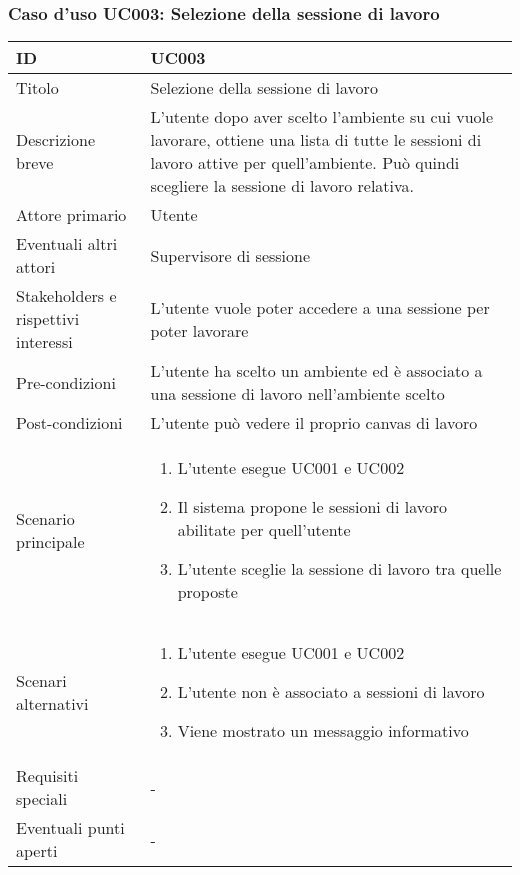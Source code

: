 \documentclass[../../main.tex]{subfiles}
\begin{document}
\subsubsection{Caso d’uso UC003: Selezione della sessione di lavoro }
\begin{tabularx}{150mm}{|l|X|}
    \hline
    ID                                  & \textbf{UC003}\\
    \hline
    Titolo                              & Selezione della sessione di lavoro \\
    \hline
    Descrizione breve                   & L'utente dopo aver scelto l'ambiente su cui vuole lavorare, ottiene una lista di tutte le sessioni di lavoro attive per quell'ambiente. Può quindi scegliere la sessione di lavoro relativa.   \\
    \hline
    Attore primario                     & Utente   \\
    \hline
    Eventuali altri attori              & Supervisore di sessione   \\
    \hline
    Stakeholders e rispettivi interessi & L'utente vuole poter accedere a una sessione per poter lavorare   \\
    \hline
    Pre-condizioni                      & L'utente ha scelto un ambiente ed è associato a una sessione di lavoro nell'ambiente scelto   \\
    \hline
    Post-condizioni                     & L'utente può vedere il proprio canvas di lavoro   \\
    \hline
    Scenario principale                 & \begin{enumerate}
        \item L'utente esegue UC001 e UC002
        \item Il sistema propone le sessioni di lavoro abilitate per quell'utente
        \item L'utente sceglie la sessione di lavoro tra quelle proposte
    \end{enumerate} \\
    \hline
    Scenari alternativi &
    \begin{enumerate}
        \item L'utente esegue UC001 e UC002
        \item L'utente non è associato a sessioni di lavoro
        \item Viene mostrato un messaggio informativo
    \end{enumerate}
        \\
    \hline
    Requisiti speciali                  & -   \\
    \hline
    Eventuali punti aperti              & -   \\
    \hline
\end{tabularx}
\newpage
\end{document}
